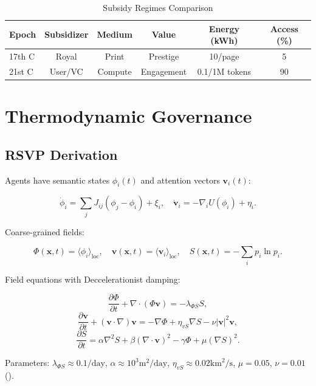 \documentclass[12pt]{article}
\begin{document}
\begin{table}[h]
\caption{Subsidy Regimes Comparison}
\begin{center}
\begin{tabular}{lccccc}
\toprule
\textbf{Epoch} & \textbf{Subsidizer} & \textbf{Medium} & \textbf{Value} & \textbf{Energy (kWh)} & \textbf{Access (\%)} \\
\midrule
17th C & Royal & Print & Prestige & 10/page & 5 \\
21st C & User/VC & Compute & Engagement & 0.1/1M tokens & 90 \\
\bottomrule
\end{tabular}
\end{center}
\label{tab:subsidy}
\end{table}

\section{Thermodynamic Governance}

\subsection{RSVP Derivation}

Agents have semantic states \(\phi_i(t)\) and attention vectors \(\mathbf{v}_i(t)\):

\[
\dot{\phi}_i = \sum_j J_{ij}(\phi_j - \phi_i) + \xi_i, \quad \dot{\mathbf{v}}_i = -\nabla_i U(\phi_i) + \eta_i.
\]

Coarse-grained fields:

\[
\Phi(\mathbf{x},t) = \langle \phi_i \rangle_{\text{loc}}, \quad \mathbf{v}(\mathbf{x},t) = \langle \mathbf{v}_i \rangle_{\text{loc}}, \quad S(\mathbf{x},t) = -\sum_i p_i \ln p_i.
\]

Field equations with Deccelerationist damping:

\[
\frac{\partial \Phi}{\partial t} + \nabla \cdot (\Phi \mathbf{v}) = -\lambda_{\Phi S} S,
\]
\[
\frac{\partial \mathbf{v}}{\partial t} + (\mathbf{v} \cdot \nabla) \mathbf{v} = -\nabla \Phi + \eta_{vS} \nabla S - \nu |\mathbf{v}|^2 \mathbf{v},
\]
\[
\frac{\partial S}{\partial t} = \alpha \nabla^2 S + \beta (\nabla \cdot \mathbf{v})^2 - \gamma \Phi + \mu (\nabla S)^2.
\]

Parameters: \(\lambda_{\Phi S} \approx 0.1/\text{day}\), \(\alpha \approx 10^3 \text{m}^2/\text{day}\), \(\eta_{vS} \approx 0.02 \text{km}^2/\text{s}\), \(\mu = 0.05\), \(\nu = 0.01\) (\citealp{Gleeson2014,Yasseri2012}).
\end{document}
